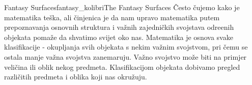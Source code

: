 \begin{surferIntroPage}{Fantasy Surfaces}{fantasy_kolibri}{The Fantasy Surfaces}
\v{C}esto \v{c}ujemo kako je matematika te\v{s}ka, ali \v{c}injenica je da nam upravo matematika putem prepoznavanja osnovnih struktura i va\v{z}nih zajedni\v{c}kih svojstava odre\dj{}enih objekata poma\v{z}e da shvatimo svijet oko nas. Matematika je osnova svake klasifikacije - okupljanja svih objekata s nekim va\v{z}nim svojstvom, pri \v{c}emu se ostala manje va\v{z}na svojstva zanemaruju. Va\v{z}no svojstvo mo\v{z}e biti na primjer veli\v{c}ina ili oblik nekog predmeta. Klasifikacijom objekata dobivamo pregled razli\v{c}itih predmeta i oblika koji nas okru\v{z}uju.  \\

\vspace{0.4cm}


\end{surferIntroPage}
